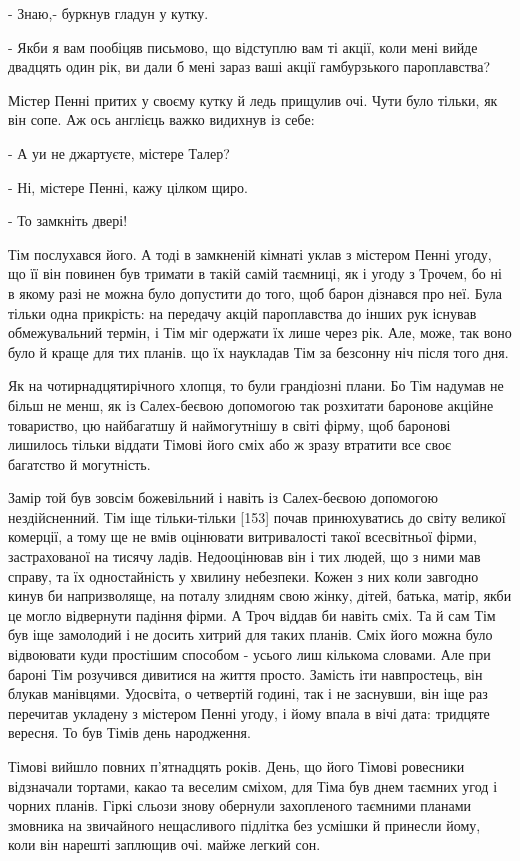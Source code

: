 - Знаю,- буркнув гладун у кутку.

- Якби я вам пообіцяв письмово, що відступлю вам ті акції, коли мені вийде двадцять один рік, ви дали б мені зараз ваші акції гамбурзького пароплавства?

Містер Пенні притих у своєму кутку й ледь прищулив очі. Чути було тільки, як він сопе. Аж ось англієць важко видихнув із себе:

- А уи не джартуєте, містере Талер?

- Ні, містере Пенні, кажу цілком щиро.

- То замкніть двері!

Тім послухався його. А тоді в замкненій кімнаті уклав з містером Пенні угоду, що її він повинен був тримати в такій самій таємниці, як і угоду з Трочем, бо ні в якому разі не можна було допустити до того, щоб барон дізнався про неї. Була тільки одна прикрість: на передачу акцій пароплавства до інших рук існував обмежувальний термін, і Тім міг одержати їх лише через рік. Але, може, так воно було й краще для тих планів. що їх наукладав Тім за безсонну ніч після того дня.

Як на чотирнадцятирічного хлопця, то були грандіозні плани. Бо Тім надумав не більш не менш, як із Салех-беєвою допомогою так розхитати баронове акційне товариство, цю найбагатшу й наймогутнішу в світі фірму, щоб баронові лишилось тільки віддати Тімові його сміх або ж зразу втратити все своє багатство й могутність.

Замір той був зовсім божевільний і навіть із Салех-беєвою допомогою нездійсненний. Тім іще тільки-тільки [153] почав принюхуватись до світу великої комерції, а тому ще не вмів оцінювати витривалості такої всесвітньої фірми, застрахованої на тисячу ладів. Недооцінював він і тих людей, що з ними мав справу, та їх одностайність у хвилину небезпеки. Кожен з них коли завгодно кинув би напризволяще, на поталу злидням свою жінку, дітей, батька, матір, якби це могло відвернути падіння фірми. А Троч віддав би навіть сміх. Та й сам Тім був іще замолодий і не досить хитрий для таких планів. Сміх його можна було відвоювати куди простішим способом - усього лиш кількома словами. Але при бароні Тім розучився дивитися на життя просто. Замість іти навпростець, він блукав манівцями. Удосвіта, о четвертій годині, так і не заснувши, він іще раз перечитав укладену з містером Пенні угоду, і йому впала в вічі дата: тридцяте вересня. То був Тімів день народження.

Тімові вийшло повних п'ятнадцять років. День, що його Тімові ровесники відзначали тортами, какао та веселим сміхом, для Тіма був днем таємних угод і чорних планів. Гіркі сльози знову обернули захопленого таємними планами змовника на звичайного нещасливого підлітка без усмішки й принесли йому, коли він нарешті заплющив очі. майже легкий сон.

